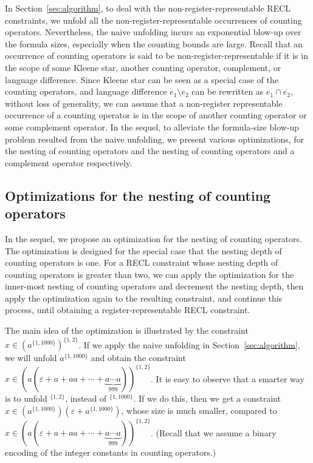 
In Section~\ref{sec:algorithm}, to deal with the non-register-representable RECL constraints, we unfold all the non-register-representable occurrences of counting operators. Nevertheless, 
the naive unfolding incurs an exponential blow-up over the formula sizes, especially when the counting bounds are large. 
Recall that an occurrence of counting operators is said to be non-register-representable if it is in the scope of some Kleene star, another counting operator, complement, or language difference. Since Kleene star can be seen as a special case of the counting operators, and language difference $e_1 \setminus e_2$ can be rewritten as $e_1 \cap \overline{e_2}$, without loss of generality, we can assume that a non-register representable occurrence of a counting operator is in the scope of another counting operator or some complement operator. 
In the sequel, to alleviate the formula-size blow-up problem resulted from the naive unfolding, we present various optimizations, for the nesting of counting operators and the nesting of counting operators and a complement operator respectively. 

\subsection{Optimizations for the nesting of counting operators}\label{heuristic:nested}

In the sequel, we propose an optimization for the nesting of counting operators. 
The optimization is designed for the special case that the nesting depth of counting operators is one. For a RECL constraint whose nesting depth of counting operators is greater than two, we can apply the optimization for the inner-most nesting of counting operators and decrement the nesting depth, then apply the optimization again to the resulting constraint, and continue this process, until obtaining a register-representable RECL constraint.  

The main idea of the optimization is illustrated by the constraint $x \in (a^{\{1,1000\}})^{\{1,2\}}$. If we apply the naive unfolding in Section~\ref{sec:algorithm}, we will unfold  $a^{\{1,1000\}}$ and obtain the constraint $x \in (a(\varepsilon + a + aa + \cdots + \underbrace{a\cdots a}_{999}))^{\{1,2\}}$. It is easy to observe that a smarter way is to unfold  $^{\{1,2\}}$, instead of $^{\{1, 1000\}}$. If we do this, then we get a constraint $x \in (a^{\{1,1000\}})(\varepsilon + a^{\{1,1000\}})$, whose size is much smaller, compared to $x \in (a(\varepsilon + a + aa + \cdots + \underbrace{a\cdots a}_{999}))^{\{1,2\}}$. (Recall that we assume a binary encoding of the integer constants in counting operators.)

